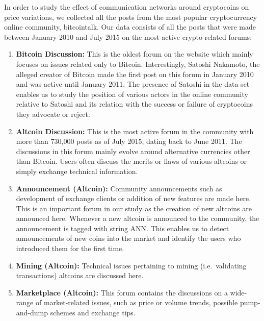 In order to study the effect of communication networks around cryptocoins on
price variations, we collected all the posts from the most popular cryptocurrency
online community, bitcointalk.  Our data consists of all the posts that were
made between January 2010 and July 2015 on the most active crypto-related forums:
\begin{enumerate}[topsep=0pt,itemsep=-0.5ex,partopsep=1ex,parsep=1ex]
  \item \textbf{Bitcoin Discussion:} This is the oldest forum on the website which mainly focuses
    on issues related only to Bitcoin. Interestingly, Satoshi Nakamoto, the alleged
    creator of Bitcoin made the first post on this forum in January 2010 and
    was active until January 2011. The presence of Satoshi in the data set enables us
    to study the position of various actors in the online community relative to Satoshi
    and its relation with the success or failure of cryptocoins they advocate or reject.
  \item \textbf{Altcoin Discussion:} This is the most active forum in the community
    with more than 730,000 posts as of July 2015, dating back to June 2011.
    The discussions in this forum mainly evolve around alternative currencies
    other than Bitcoin. Users often discuss the merits or flaws of various
    altcoins or simply exchange technical information.
  \item \textbf{Announcement (Altcoin):} Community announcements such as development of 
    exchange clients or addition of new features are made here. This is an important forum
    in our study as the creation of new altcoins are announced here. Whenever a new
    altcoin is announced to the community, the announcement is tagged with string ANN.
    This enables us to detect announcements of new coins into the market and identify
    the users who introduced them for the first time.
  \item \textbf{Mining (Altcoin):} Technical issues pertaining to mining (i.e.~validating transactions)
    altcoins are discussed here.
  \item \textbf{Marketplace (Altcoin):} This forum contains the discussions on a wide-range of 
    market-related issues, such as price or volume trends, possible pump-and-dump schemes
    and exchange tips.
\end{enumerate}

